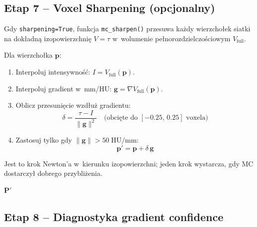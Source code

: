 \documentclass[12pt,a4paper]{article}
\begin{document}
\subsection{Etap 7 -- Voxel Sharpening (opcjonalny)}
\label{sec:sharpen}

Gdy \texttt{sharpening=True}, funkcja \texttt{mc\_sharpen()} przesuwa każdy
wierzchołek siatki na dokładną izopowierzchnię $V = \tau$ w~wolumenie
pełnorozdzielczościowym $V_{\text{full}}$.

Dla wierzchołka $\mathbf{p}$:
\begin{enumerate}
  \item Interpoluj intensywność:
    $I = V_{\text{full}}(\mathbf{p})$.
  \item Interpoluj gradient w~mm/HU:
    $\mathbf{g} = \nabla V_{\text{full}}(\mathbf{p})$.
  \item Oblicz przesunięcie wzdłuż gradientu:
    \[
      \delta = \frac{\tau - I}{\|\mathbf{g}\|^2}
      \quad \text{(obcięte do } [-0.25,\, 0.25] \text{ voxela)}
    \]
  \item Zastosuj tylko gdy $\|\mathbf{g}\| > 50\;\text{HU/mm}$:
    \[
      \mathbf{p}' = \mathbf{p} + \delta\,\mathbf{g}
    \]
\end{enumerate}

Jest to krok Newton'a w~kierunku izopowierzchni; jeden krok wystarcza, gdy
MC dostarczył dobrego przybliżenia.

\begin{algorithm}[H]
\caption{\textsc{Sharpen} -- voxel sharpening (subpikselowe przesunięcie wierzchołków)}
\label{alg:sharp}
\BlankLine
{}
\Return $\mathbf{P}'$\;
\end{algorithm}

\subsection{Etap 8 -- Diagnostyka gradient confidence}
\label{sec:diagn}
\end{document}

